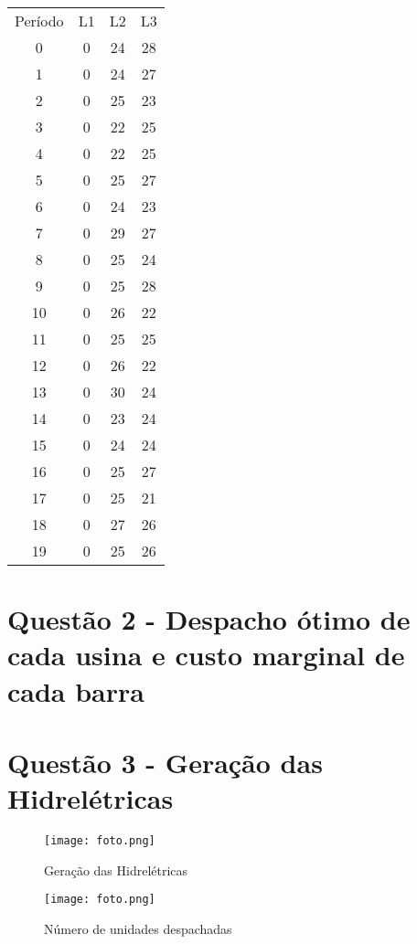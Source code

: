 \documentclass[a4paper,12pt,twoside]{article}
\begin{document}
\begin{center}
    \begin{tabular}{ c c c c }
        Período & L1 & L2 & L3 \\
        0  & 0 & 24 & 28 \\
        1  & 0 & 24 & 27 \\
        2  & 0 & 25 & 23 \\
        3  & 0 & 22 & 25 \\
        4  & 0 & 22 & 25 \\
        5  & 0 & 25 & 27 \\
        6  & 0 & 24 & 23 \\
        7  & 0 & 29 & 27 \\
        8  & 0 & 25 & 24 \\
        9  & 0 & 25 & 28 \\
        10 & 0 & 26 & 22 \\
        11 & 0 & 25 & 25 \\
        12 & 0 & 26 & 22 \\
        13 & 0 & 30 & 24 \\
        14 & 0 & 23 & 24 \\
        15 & 0 & 24 & 24 \\
        16 & 0 & 25 & 27 \\
        17 & 0 & 25 & 21 \\
        18 & 0 & 27 & 26 \\
        19 & 0 & 25 & 26
    \end{tabular}
\end{center}

\newpage
\section{Questão 2 - Despacho ótimo de cada usina e custo marginal de cada barra}

\newpage
\section{Questão 3 - Geração das Hidrelétricas}
\begin{figure}[h!]
    \centering
  \texttt{[image: foto.png]}
  \caption{Geração das Hidrelétricas}\label{q3a}
\end{figure}

\begin{figure}[h!]
    \centering
  \texttt{[image: foto.png]}
  \caption{Número de unidades despachadas}\label{q3b}
\end{figure}
\end{document}
